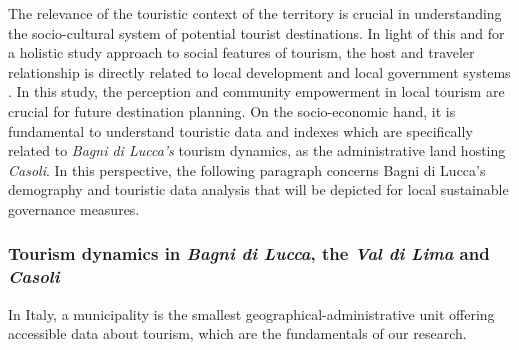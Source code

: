 \documentclass[sustainability,article,submit,pdftex,moreauthors]{Definitions/mdpi}
\begin{document}

The relevance of the touristic context of the territory is crucial in understanding the socio-cultural system of potential tourist destinations. In light of this and for a holistic study approach to social features of tourism, the host and traveler relationship is directly related to local development and local government systems \cite{amo21}. In this study, the perception and community empowerment in local tourism are crucial for future destination planning.
On the socio-economic hand, it is fundamental to understand touristic data and indexes which are specifically related to \textit{Bagni di Lucca's} tourism dynamics, as the administrative land hosting \textit{Casoli}. 
In this perspective, the following paragraph concerns {Bagni di Lucca's} demography and touristic data analysis that will be depicted for local sustainable governance measures.



\subsubsection{Tourism dynamics in \emph{Bagni di Lucca}, the \emph{Val di Lima} and \emph{Casoli}}

In Italy, a municipality is the smallest geographical-administrative unit offering accessible data about tourism, which are the fundamentals of our research.

\end{document}
